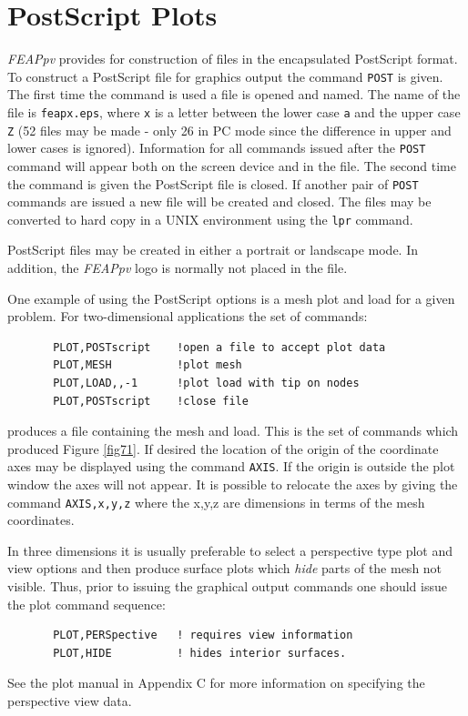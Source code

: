 \section{PostScript Plots}
\label{postscript}

{\sl FEAPpv} provides for construction of files in the encapsulated 
PostScript format.  To
construct a PostScript file for graphics output the command {\tt POST}
is given.  The first time the command is used a file is opened and
named.  The name of the file is {\tt feapx.eps},
where {\tt x} is a letter between
the lower case {\tt a} and the upper case {\tt Z} (52 files may be made -
only
26 in PC mode since the difference in upper and lower cases is ignored).
Information for all commands issued after the {\tt POST} command will appear
both on the screen device and in the file.  The second time the command is
given the PostScript file is closed.  If another pair of {\tt POST} commands
are issued a new file will be created and closed.  The files may be converted
to hard copy in a UNIX environment using the {\tt lpr} command.

PostScript files may be created in either a portrait or landscape mode.
In addition, the {\sl FEAPpv} logo is normally not placed in the file.

One example of using the PostScript options is a mesh plot and load
for a given problem.  For two-dimensional applications the 
set of commands:
\begin{verbatim}
       PLOT,POSTscript    !open a file to accept plot data
       PLOT,MESH          !plot mesh
       PLOT,LOAD,,-1      !plot load with tip on nodes
       PLOT,POSTscript    !close file
\end{verbatim}
produces a file containing the mesh and load.
This is the set of commands which produced Figure \ref{fig71}.
If desired the location of the origin of the coordinate axes may be
displayed using the command {\tt AXIS}.  If the origin is outside the
plot window the axes will not appear.  It is possible to relocate the
axes by giving the command
{\tt AXIS,x,y,z} where the x,y,z are dimensions in terms of
the mesh coordinates.

In three dimensions it is
usually preferable to select a perspective type plot and view options
and then produce
surface plots which {\it hide} parts of the mesh not visible.  Thus, prior
to issuing the graphical output
commands one should issue the plot command sequence:
\begin{verbatim}
       PLOT,PERSpective   ! requires view information
       PLOT,HIDE          ! hides interior surfaces.
\end{verbatim}
See the plot manual in Appendix C
for more information on specifying the perspective view data.

